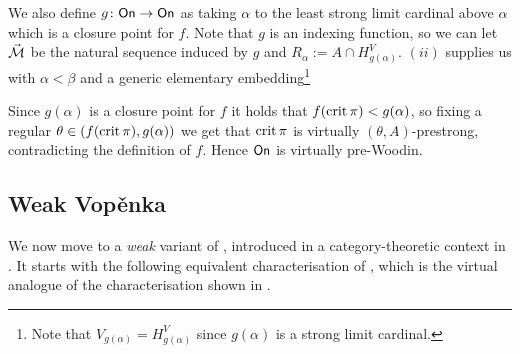 \documentclass[../../main]{subfiles}
\begin{document}
{  \qquad We also define $g\colon\textsf{On}\to\textsf{On}$ as taking $\alpha$ to the least strong limit cardinal above $\alpha$ which is a closure point for $f$. Note that $g$ is an indexing function, so we can let $\vec{\operatorname{\mathcal M}}$ be the natural sequence induced by $g$ and $R_\alpha := A\cap H_{g(\alpha)}^V$. $(ii)$ supplies us with $\alpha<\beta$ and a generic elementary embedding\footnote{Note that $V_{g(\alpha)}=H_{g(\alpha)}^V$ since $g(\alpha)$ is a strong limit cardinal.}

  Since $g(\alpha)$ is a closure point for $f$ it holds that $f(\operatorname{crit}\pi)<g(\alpha)$, so fixing a regular $\theta\in(f(\operatorname{crit}\pi), g(\alpha))$ we get that $\operatorname{crit}\pi$ is virtually $(\theta, A)$-prestrong, contradicting the definition of $f$. Hence $\textsf{On}$ is virtually pre-Woodin.
}


\subsection{Weak Vop\v enka}

We now move to a \textit{weak} variant of \gvp, introduced in a category-theoretic context in \cite{AdamekRosicky}. It starts with the following equivalent characterisation of \gvp, which is the virtual analogue of the characterisation shown in \cite{AdamekRosicky}.
\end{document}
